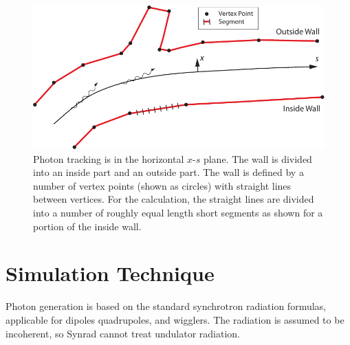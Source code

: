 \documentclass[11pt]{article}
\begin{document}
  \begin{figure}[tb]
  \begin{center}
  \includegraphics[width=5in]{wall.pdf}
  \caption{
Photon tracking is in the horizontal $x$-$s$ plane. The wall is
divided into an inside part and an outside part. The wall is defined
by a number of vertex points (shown as circles) with straight lines
between vertices. For the calculation, the straight lines are divided
into a number of roughly equal length short segments as shown for
a portion of the inside wall.
  }
  \label{f:wall}
  \end{center}
  \end{figure}

\section{Simulation Technique} 

Photon generation is based on the standard synchrotron radiation
formulas, applicable for dipoles quadrupoles, and wigglers. The
radiation is assumed to be incoherent, so Synrad cannot treat
undulator radiation. 
\end{document}
